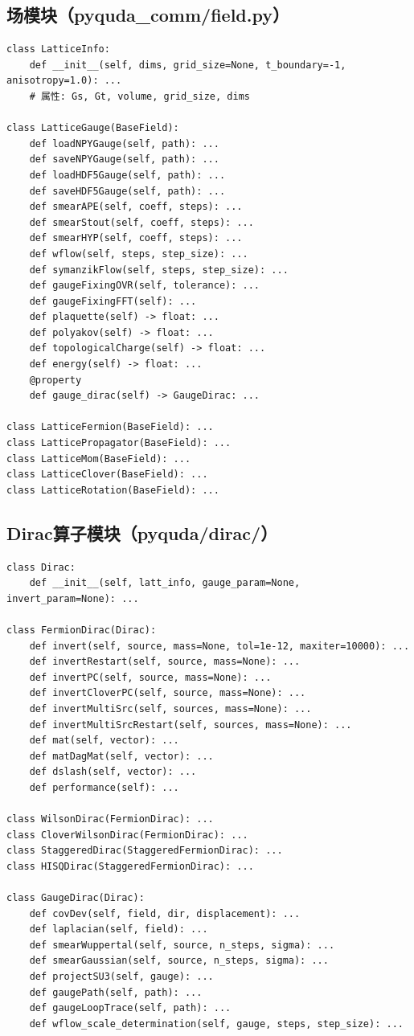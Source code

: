 \documentclass[12pt,a4paper]{ctexart}
\begin{document}
\subsection{场模块（pyquda\_comm/field.py）}

\begin{lstlisting}[caption={场基类}]
class LatticeInfo:
    def __init__(self, dims, grid_size=None, t_boundary=-1, anisotropy=1.0): ...
    # 属性: Gs, Gt, volume, grid_size, dims

class LatticeGauge(BaseField):
    def loadNPYGauge(self, path): ...
    def saveNPYGauge(self, path): ...
    def loadHDF5Gauge(self, path): ...
    def saveHDF5Gauge(self, path): ...
    def smearAPE(self, coeff, steps): ...
    def smearStout(self, coeff, steps): ...
    def smearHYP(self, coeff, steps): ...
    def wflow(self, steps, step_size): ...
    def symanzikFlow(self, steps, step_size): ...
    def gaugeFixingOVR(self, tolerance): ...
    def gaugeFixingFFT(self): ...
    def plaquette(self) -> float: ...
    def polyakov(self) -> float: ...
    def topologicalCharge(self) -> float: ...
    def energy(self) -> float: ...
    @property
    def gauge_dirac(self) -> GaugeDirac: ...

class LatticeFermion(BaseField): ...
class LatticePropagator(BaseField): ...
class LatticeMom(BaseField): ...
class LatticeClover(BaseField): ...
class LatticeRotation(BaseField): ...
\end{lstlisting}

\subsection{Dirac算子模块（pyquda/dirac/）}

\begin{lstlisting}[caption={Dirac算子接口}]
class Dirac:
    def __init__(self, latt_info, gauge_param=None, invert_param=None): ...

class FermionDirac(Dirac):
    def invert(self, source, mass=None, tol=1e-12, maxiter=10000): ...
    def invertRestart(self, source, mass=None): ...
    def invertPC(self, source, mass=None): ...
    def invertCloverPC(self, source, mass=None): ...
    def invertMultiSrc(self, sources, mass=None): ...
    def invertMultiSrcRestart(self, sources, mass=None): ...
    def mat(self, vector): ...
    def matDagMat(self, vector): ...
    def dslash(self, vector): ...
    def performance(self): ...

class WilsonDirac(FermionDirac): ...
class CloverWilsonDirac(FermionDirac): ...
class StaggeredDirac(StaggeredFermionDirac): ...
class HISQDirac(StaggeredFermionDirac): ...

class GaugeDirac(Dirac):
    def covDev(self, field, dir, displacement): ...
    def laplacian(self, field): ...
    def smearWuppertal(self, source, n_steps, sigma): ...
    def smearGaussian(self, source, n_steps, sigma): ...
    def projectSU3(self, gauge): ...
    def gaugePath(self, path): ...
    def gaugeLoopTrace(self, path): ...
    def wflow_scale_determination(self, gauge, steps, step_size): ...
\end{lstlisting}
\end{document}
